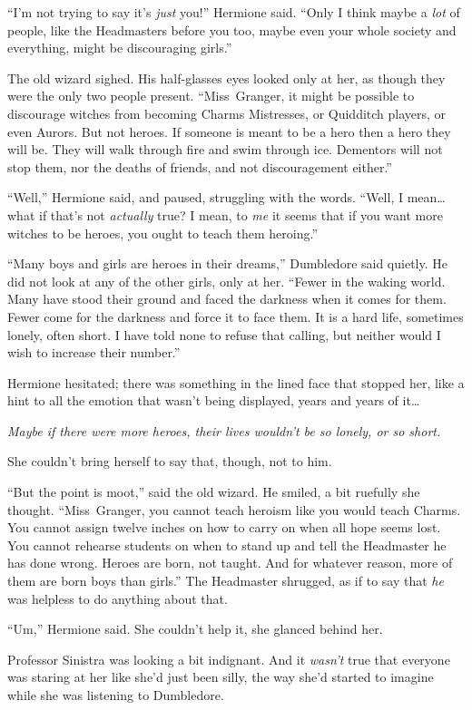 “I’m not trying to say it’s \emph{just} you!” Hermione said. “Only I think maybe a \emph{lot} of people, like the Headmasters before you too, maybe even your whole society and everything, might be discouraging girls.”

The old wizard sighed. His half-glasses eyes looked only at her, as though they were the only two people present. “Miss~Granger, it might be possible to discourage witches from becoming Charms Mistresses, or Quidditch players, or even Aurors. But not heroes. If someone is meant to be a hero then a hero they will be. They will walk through fire and swim through ice. Dementors will not stop them, nor the deaths of friends, and not discouragement either.”

“Well,” Hermione said, and paused, struggling with the words. “Well, I mean…what if that’s not \emph{actually} true? I mean, to \emph{me} it seems that if you want more witches to be heroes, you ought to teach them heroing.”

“Many boys and girls are heroes in their dreams,” Dumbledore said quietly. He did not look at any of the other girls, only at her. “Fewer in the waking world. Many have stood their ground and faced the darkness when it comes for them. Fewer come for the darkness and force it to face them. It is a hard life, sometimes lonely, often short. I have told none to refuse that calling, but neither would I wish to increase their number.”

Hermione hesitated; there was something in the lined face that stopped her, like a hint to all the emotion that wasn’t being displayed, years and years of it…

\emph{Maybe if there were more heroes, their lives wouldn’t be so lonely, or so short.}

She couldn’t bring herself to say that, though, not to him.

“But the point is moot,” said the old wizard. He smiled, a bit ruefully she thought. “Miss~Granger, you cannot teach heroism like you would teach Charms. You cannot assign twelve inches on how to carry on when all hope seems lost. You cannot rehearse students on when to stand up and tell the Headmaster he has done wrong. Heroes are born, not taught. And for whatever reason, more of them are born boys than girls.” The Headmaster shrugged, as if to say that \emph{he} was helpless to do anything about that.

“Um,” Hermione said. She couldn’t help it, she glanced behind her.

Professor Sinistra was looking a bit indignant. And it \emph{wasn’t} true that everyone was staring at her like she’d just been silly, the way she’d started to imagine while she was listening to Dumbledore.

